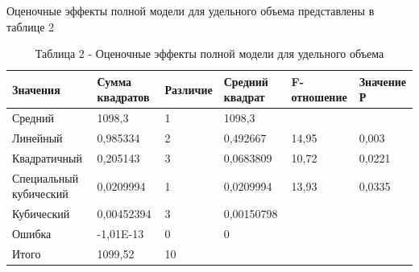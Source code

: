 Оценочные эффекты полной модели для удельного объема представлены в
таблице 2

\begin{table}[H]
\caption*{Таблица 2 - Оценочные эффекты полной модели для удельного объема}
\centering
\begin{tabular}{|l|l|l|l|l|l|}
\hline
Значения               & Сумма квадратов & Различие & Средний квадрат & F-отношение & Значение Р \\ \hline
Средний                & 1098,3          & 1        & 1098,3          &             &            \\ \hline
Линейный               & 0,985334        & 2        & 0,492667        & 14,95       & 0,003      \\ \hline
Квадратичный           & 0,205143        & 3        & 0,0683809       & 10,72       & 0,0221     \\ \hline
\begin{minipage}{2.5cm}Специальный кубический\end{minipage} & 0,0209994       & 1        & 0,0209994       & 13,93       & 0,0335     \\ \hline
Кубический             & 0,00452394      & 3        & 0,00150798      &             &            \\ \hline
Ошибка                 & -1,01E-13       & 0        & 0               &             &            \\ \hline
Итого                  & 1099,52         & 10       &                 &             &            \\ \hline
\end{tabular}
\end{table}

